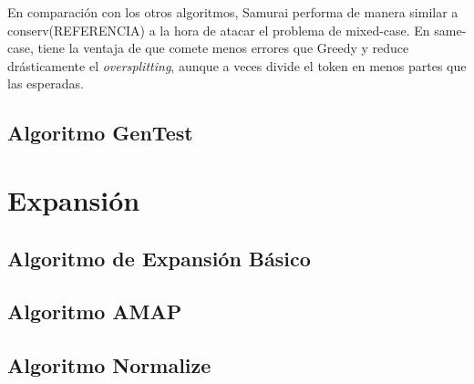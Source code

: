 En comparación con los otros algoritmos, Samurai performa de manera similar a conserv(REFERENCIA) a la hora de atacar el problema de mixed-case.
En same-case, tiene la ventaja de que comete menos errores que Greedy y reduce drásticamente el \textit{oversplitting}, aunque a veces divide el token en menos partes que las esperadas.

\subsection{Algoritmo GenTest}

\section{Expansión}
\subsection{Algoritmo de Expansión Básico}
\subsection{Algoritmo AMAP}
\subsection{Algoritmo Normalize}
